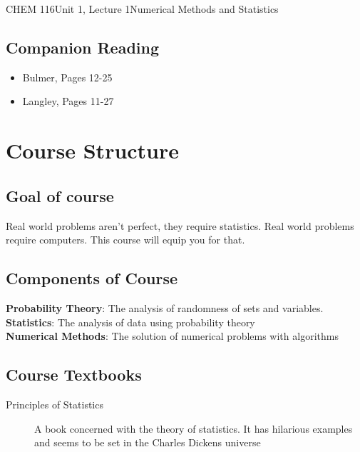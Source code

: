 \documentclass{article}
\begin{document}
\begin{tdoc}{CHEM 116}{Unit 1, Lecture 1}{Numerical Methods and Statistics}

\subsection*{Companion Reading}

\begin{itemize}
  \item Bulmer, Pages 12-25
  \item Langley, Pages 11-27
\end{itemize}

\section{Course Structure}

\subsection{Goal of course}

Real world problems aren't perfect, they require statistics. Real
world problems require computers. This course will equip you for that.

\subsection{Components of Course}

{\bf Probability Theory}: The analysis of randomness of sets and variables.\vspace{0.2cm}\\
{\bf Statistics}: The analysis of data using probability theory\vspace{0.2cm}\\
{\bf Numerical Methods}: The solution of numerical problems with algorithms\vspace{0.2cm}\\

\subsection{Course Textbooks}

\begin{description}

\item[Principles of Statistics]{A book concerned with the theory of statistics. It has hilarious examples and seems to be set in the Charles Dickens universe}


\end{description}
\end{tdoc}
\end{document}
